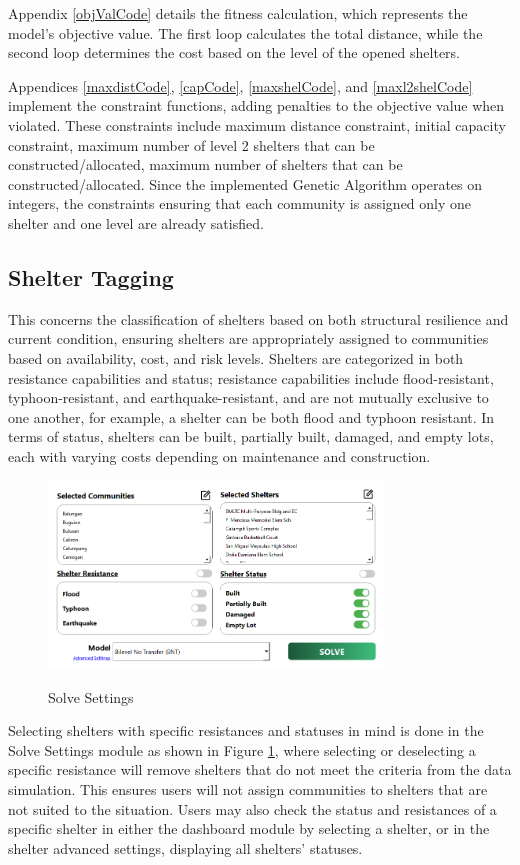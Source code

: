 	Appendix \ref{objValCode} details the fitness calculation, which represents the model's objective value. The first loop calculates the total distance, while the second loop determines the cost based on the level of the opened shelters.
	
	Appendices \ref{maxdistCode}, \ref{capCode}, \ref{maxshelCode}, and \ref{maxl2shelCode} implement the constraint functions, adding penalties to the objective value when violated. These constraints include maximum distance constraint, initial capacity constraint, maximum number of level 2 shelters that can be constructed/allocated, maximum number of shelters that can be constructed/allocated. Since the implemented Genetic Algorithm operates on integers, the constraints ensuring that each community is assigned only one shelter and one level are already satisfied.
	
\subsection{Shelter Tagging}
	This concerns the classification of shelters based on both structural resilience and current condition, ensuring shelters are appropriately assigned to communities based on availability, cost, and risk levels. Shelters are categorized in both resistance capabilities and status; resistance capabilities include flood-resistant, typhoon-resistant, and earthquake-resistant, and are not mutually exclusive to one another, for example, a shelter can be both flood and typhoon resistant. In terms of status, shelters can be built, partially built, damaged, and empty lots, each with varying costs depending on maintenance and construction.
	
	\begin{figure}[h!]
		\caption{Solve Settings}
		\centering
		\includegraphics[width=3.5in]{Chapter 4/solvesettings}
		\label{solveSet}
	\end{figure}
	Selecting shelters with specific resistances and statuses in mind is done in the Solve Settings module as shown in Figure \ref{solveSet}, where selecting or deselecting a specific resistance will remove shelters that do not meet the criteria from the data simulation. This ensures users will not assign communities to shelters that are not suited to the situation. Users may also check the status and resistances of a specific shelter in either the dashboard module by selecting a shelter, or in the shelter advanced settings, displaying all shelters’ statuses.
	

